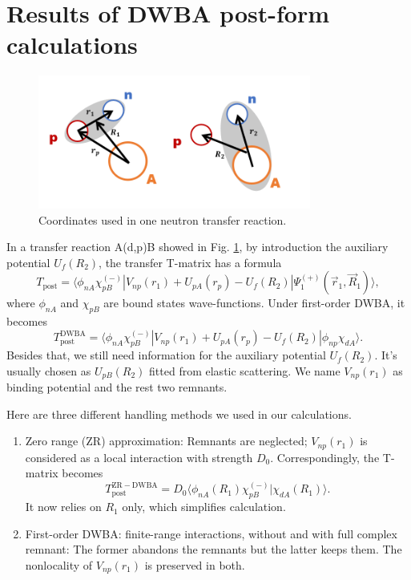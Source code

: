 \section{Results of DWBA post-form calculations}\label{sec:post}

\begin{figure}[t]
	\centering
	\includegraphics[width=0.80\textwidth]{transfer.png}
	\caption{Coordinates used in one neutron transfer reaction. }
	\label{fig:transfer}
\end{figure}
In a transfer reaction A(d,p)B showed in Fig. \ref{fig:transfer}, by introduction the auxiliary potential $U_f(R_2)$, the transfer T-matrix has a formula \cite{thompson2009nuclear}
\begin{equation}\label{eq:postexact}
	T_{\mathrm{post}}=\langle\phi_{nA}\chi_{pB}^{(-)}\left|V_{np}(r_1)+U_{pA}(r_p)-U_f(R_2)\right|\Psi_1^{(+)}(\vec{r}_1,\vec{R}_1)\rangle,
\end{equation}
where $\phi_{nA}$ and $\chi_{pB}$ are bound states wave-functions. 
Under first-order DWBA, it becomes
\begin{equation}\label{tpost}
	T_{\mathrm{post}}^{\mathrm{DWBA}}=\langle\phi_{nA}\chi_{pB}^{(-)}\left|V_{np}(r_1)+U_{pA}(r_p)-U_f(R_2)\right|\phi_{np}\chi_{dA}\rangle.
\end{equation}
Besides that, we still need information for the auxiliary potential $U_f(R_2)$. 
It's usually chosen as $U_{pB}(R_2)$ fitted from elastic scattering.
We name $V_{np}(r_1)$ as binding potential and the rest two remnants.

Here are three different handling methods we used in our calculations.
\begin{enumerate}
\item Zero range (ZR) approximation: Remnants are neglected; $V_{np}(r_1)$ is considered as a local interaction with strength $D_0$.
	Correspondingly, the T-matrix becomes
	\begin{equation}
		T_{\mathrm{post}}^{\mathrm{ZR-DWBA}}=D_0\langle\phi_{nA}(R_1)\chi_{pB}^{(-)}| \chi_{dA}(R_1)\rangle.
	\end{equation}
	It now relies on $R_1$ only, which simplifies calculation.
	\item First-order DWBA: finite-range interactions, without and with full complex remnant: The former abandons the remnants but the latter keeps them. The nonlocality of $V_{np}(r_1)$ is preserved in both.
\end{enumerate}

